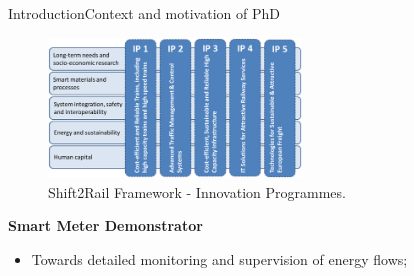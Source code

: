 \begin{frame}{Introduction}{Context and motivation of PhD}
	\begin{figure}[ht!]
	\centering
	\includegraphics[width=0.6\textwidth,keepaspectratio]{figures/1.Intro/IPs}
	\caption{Shift2Rail Framework - Innovation Programmes. \cite{shift2rail2015}}
	\end{figure}
\vspace{-1em}
	\begin{block}{\textbf{Smart Meter Demonstrator}}
	\begin{itemize}
		\setlength\itemsep{0em}
		\item Towards detailed monitoring and supervision of energy flows;
	\end{itemize}
	\end{block}



\end{frame}

